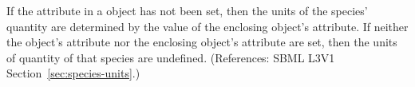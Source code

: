 If the attribute  in a \Species object has not been
set, then the units of the species' quantity are determined by the value of
the enclosing \Model object's  attribute.  If neither
the \Species object's  attribute nor the enclosing
\Model object's  attribute are set, then the units of
quantity of that species are undefined.  (References: SBML L3V1
Section~\ref{sec:species-units}.)
